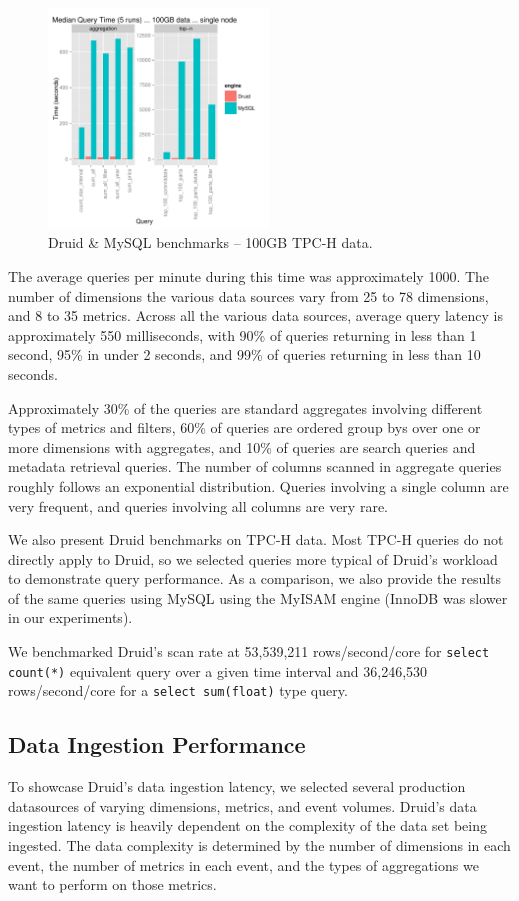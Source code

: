 \documentclass{vldb}
\begin{document}
\begin{figure}
\centering
\includegraphics[width = 2.3in]{tpch_100gb}
\caption{Druid \& MySQL benchmarks -- 100GB TPC-H data.}
\label{fig:tpch_100gb}
\end{figure}

The average queries per minute during this time was approximately
1000. The number of dimensions the various data sources vary from 25 to 78
dimensions, and 8 to 35 metrics. Across all the various data sources, average
query latency is approximately 550 milliseconds, with 90\% of queries returning
in less than 1 second, 95\% in under 2 seconds, and 99\% of queries returning
in less than 10 seconds.  

Approximately 30\% of the queries are standard
aggregates involving different types of metrics and filters, 60\% of queries
are ordered group bys over one or more dimensions with aggregates, and 10\% of
queries are search queries and metadata retrieval queries. The number of
columns scanned in aggregate queries roughly follows an exponential
distribution. Queries involving a single column are very frequent, and queries
involving all columns are very rare.

We also present Druid benchmarks on TPC-H data.  Most TPC-H queries do
not directly apply to Druid, so we selected queries more typical of Druid's
workload to demonstrate query performance. As a comparison, we also provide the
results of the same queries using MySQL using the MyISAM engine (InnoDB was
slower in our experiments).

We benchmarked Druid's scan rate at 53,539,211 rows/second/core for
\texttt{select count(*)} equivalent query over a given time interval and
36,246,530 rows/second/core for a \texttt{select sum(float)} type query.

\subsection{Data Ingestion Performance}
To showcase Druid's data ingestion latency, we selected several production
datasources of varying dimensions, metrics, and event volumes. Druid's data
ingestion latency is heavily dependent on the complexity of the data set being
ingested. The data complexity is determined by the number of dimensions in each
event, the number of metrics in each event, and the types of aggregations we
want to perform on those metrics. 
\end{document}
